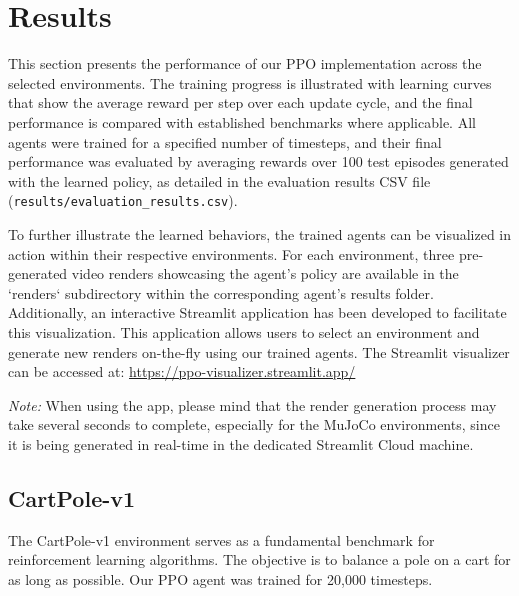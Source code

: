 \section{Results}
\label{sec:results}


This section presents the performance of our PPO implementation across the selected environments. The training progress is illustrated with learning curves that show the average reward per step over each update cycle, and the final performance is compared with established benchmarks where applicable. All agents were trained for a specified number of timesteps, and their final performance was evaluated by averaging rewards over 100 test episodes generated with the learned policy, as detailed in the evaluation results CSV file (\texttt{results/evaluation\_results.csv}).

To further illustrate the learned behaviors, the trained agents can be visualized in action within their respective environments. For each environment, three pre-generated video renders showcasing the agent's policy are available in the `renders` subdirectory within the corresponding agent's results folder. Additionally, an interactive Streamlit application has been developed to facilitate this visualization. This application allows users to select an environment and generate new renders on-the-fly using our trained agents. The Streamlit visualizer can be accessed at: \url{https://ppo-visualizer.streamlit.app/}

\textit{Note:} When using the app, please mind that the render generation process may take several seconds to complete, especially for the MuJoCo environments, since it is being generated in real-time in the dedicated Streamlit Cloud machine.

\subsection{CartPole-v1}
The CartPole-v1 environment serves as a fundamental benchmark for reinforcement learning algorithms. The objective is to balance a pole on a cart for as long as possible. Our PPO agent was trained for 20,000 timesteps.

